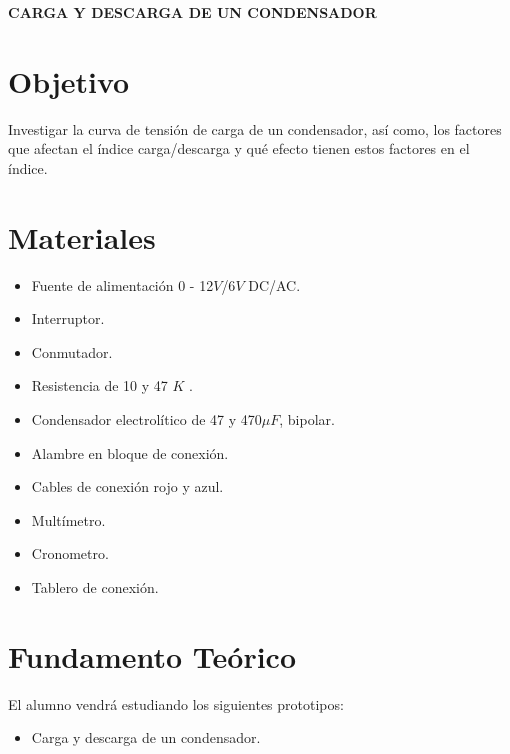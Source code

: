 \begin{center}
	{\textbf{CARGA Y DESCARGA DE UN CONDENSADOR}}
\end{center}
\section{Objetivo}
Investigar la curva de tensión de carga de un condensador, así como, los factores que afectan el índice carga/descarga y qué efecto tienen estos factores en el índice.
\section{Materiales}
\begin{itemize}
	\item Fuente de alimentación 0 - 12$V$/6$V$ DC/AC.
	\item Interruptor.
	\item Conmutador.
	\item Resistencia de 10 y 47 $K$ \textohm.
	\item Condensador electrolítico de 47 y 470$\mu F$, bipolar.
	\item Alambre en bloque de conexión.
	\item Cables de conexión rojo y azul.
	\item Multímetro.
	\item Cronometro.
	\item Tablero de conexión.  
\end{itemize}
\section{Fundamento Teórico}
El alumno vendrá estudiando los siguientes prototipos:
\begin{itemize}
	\item Carga y descarga de un condensador.
\end{itemize}
